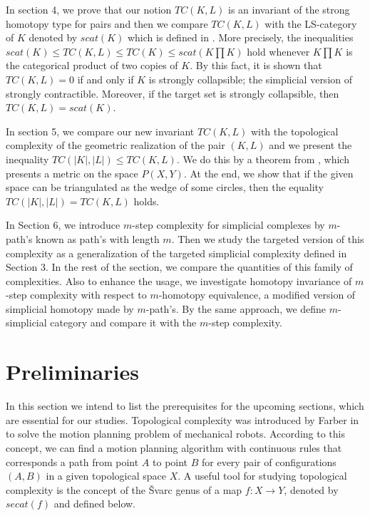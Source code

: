 \documentclass[preprint,11pt %
]{hjm1}
\theoremstyle{definition}
\begin{document}
In section 4, we prove that our notion $TC(K,L)$ is an invariant of the strong homotopy type for pairs and then we compare $TC(K,L)$ with the LS-category of $K$ denoted by $scat(K)$ which is defined in \cite{Fer}. More precisely, the inequalities $scat(K) \le TC(K,L) \le TC(K) \le scat (K \prod K)$ hold whenever $K \prod K$ is the categorical product of two copies of $K$. By this fact, it is shown that $TC(K,L) =0$ if and only if $K$ is strongly collapsible; the simplicial version of strongly contractible. Moreover, if the target set is strongly collapsible, then $TC(K,L) = scat(K)$.

In section 5, we compare our new invariant $TC(K,L)$ with the topological complexity of the geometric realization of the pair $(K,L)$ and we present the inequality $TC(|K|,|L|) \le TC(K,L)$. We do this by a theorem from \cite{Int}, which presents a metric on the space $P(X,Y)$. At the end, we show that if the given space can be triangulated as the wedge of some circles, then the equality $TC(|K|,|L|) = TC(K,L)$ holds.




In Section 6, we introduce $m$-step complexity for simplicial complexes by $m$-path's known as path's with length $m$. Then we study the targeted version of this complexity as a generalization of the targeted simplicial complexity defined in Section 3. In the rest of the section, we compare the quantities of this family of complexities. Also to enhance the usage, we investigate homotopy invariance of $m$-step complexity with respect to $m$-homotopy equivalence, a modified version of simplicial homotopy made by $m$-path's. By the same approach, we define $m$-simplicial category and compare it with the $m$-step complexity. 


\section{Preliminaries}


In this section we intend to list the prerequisites for the upcoming sections, which are essential for our studies.
Topological complexity was introduced by Farber in \cite{Far} to solve the motion planning problem of mechanical robots. According to this concept, we can find a motion planning algorithm with continuous rules that corresponds a path from point $A$ to point $B$ for every pair of configurations $(A, B)$ in a given topological space $X$. 
A useful tool for studying topological complexity is the concept of the \v{S}varc genus of a map $f:X\to Y$, denoted by $secat(f)$ and defined below.
\end{document}
